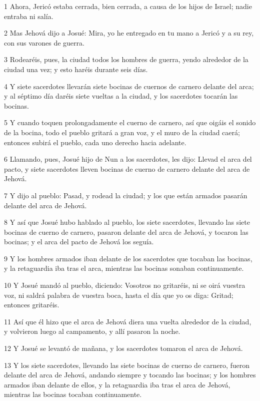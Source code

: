 \par 1 Ahora, Jericó estaba cerrada, bien cerrada, a causa de los hijos de Israel; nadie entraba ni salía.
\par 2 Mas Jehová dijo a Josué: Mira, yo he entregado en tu mano a Jericó y a su rey, con sus varones de guerra.
\par 3 Rodearéis, pues, la ciudad todos los hombres de guerra, yendo alrededor de la ciudad una vez; y esto haréis durante seis días.
\par 4 Y siete sacerdotes llevarán siete bocinas de cuernos de carnero delante del arca; y al séptimo día daréis siete vueltas a la ciudad, y los sacerdotes tocarán las bocinas.
\par 5 Y cuando toquen prolongadamente el cuerno de carnero, así que oigáis el sonido de la bocina, todo el pueblo gritará a gran voz, y el muro de la ciudad caerá; entonces subirá el pueblo, cada uno derecho hacia adelante.
\par 6 Llamando, pues, Josué hijo de Nun a los sacerdotes, les dijo: Llevad el arca del pacto, y siete sacerdotes lleven bocinas de cuerno de carnero delante del arca de Jehová.
\par 7 Y dijo al pueblo: Pasad, y rodead la ciudad; y los que están armados pasarán delante del arca de Jehová.
\par 8 Y así que Josué hubo hablado al pueblo, los siete sacerdotes, llevando las siete bocinas de cuerno de carnero, pasaron delante del arca de Jehová, y tocaron las bocinas; y el arca del pacto de Jehová los seguía.
\par 9 Y los hombres armados iban delante de los sacerdotes que tocaban las bocinas, y la retaguardia iba tras el arca, mientras las bocinas sonaban continuamente.
\par 10 Y Josué mandó al pueblo, diciendo: Vosotros no gritaréis, ni se oirá vuestra voz, ni saldrá palabra de vuestra boca, hasta el día que yo os diga: Gritad; entonces gritaréis.
\par 11 Así que él hizo que el arca de Jehová diera una vuelta alrededor de la ciudad, y volvieron luego al campamento, y allí pasaron la noche.
\par 12 Y Josué se levantó de mañana, y los sacerdotes tomaron el arca de Jehová.
\par 13 Y los siete sacerdotes, llevando las siete bocinas de cuerno de carnero, fueron delante del arca de Jehová, andando siempre y tocando las bocinas; y los hombres armados iban delante de ellos, y la retaguardia iba tras el arca de Jehová, mientras las bocinas tocaban continuamente.
